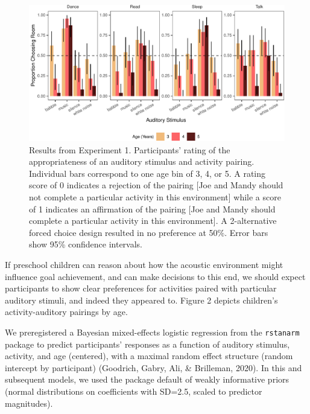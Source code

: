 \documentclass[10pt, letterpaper]{article}
\newenvironment{CodeChunk}{}{}
\begin{document}
\begin{CodeChunk}
\begin{figure}[t]

{\centering \includegraphics{figs/e3b-bar-1} 

}

\caption[Results from Experiment 1]{Results from Experiment 1. Participants' rating of the appropriateness of an auditory stimulus and activity pairing. Individual bars correspond to one age bin of 3, 4, or 5. A rating score of 0 indicates a rejection of the pairing [Joe and Mandy should not complete a particular activity in this environment] while a score of 1 indicates an affirmation of the pairing [Joe and Mandy should complete a particular activity in this environment]. A 2-alternative forced choice design resulted in no preference at 50\%.  Error bars show 95\% confidence intervals.}\label{fig:e3b-bar}
\end{figure}
\end{CodeChunk}

If preschool children can reason about how the acoustic environment
might influence goal achievement, and can make decisions to this end, we
should expect participants to show clear preferences for activities
paired with particular auditory stimuli, and indeed they appeared to.
Figure 2 depicts children's activity-auditory pairings by age.

We preregistered a Bayesian mixed-effects logistic regression from the
\texttt{rstanarm} package to predict participants' responses as a
function of auditory stimulus, activity, and age (centered), with a
maximal random effect structure (random intercept by participant)
(Goodrich, Gabry, Ali, \& Brilleman, 2020). In this and subsequent
models, we used the package default of weakly informative priors (normal
distributions on coefficients with SD=2.5, scaled to predictor
magnitudes).
\end{document}
